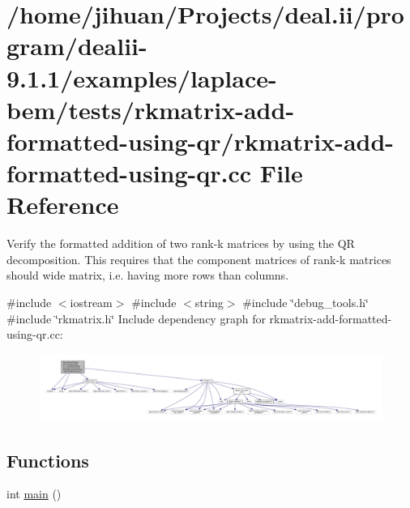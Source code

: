 \hypertarget{rkmatrix-add-formatted-using-qr_8cc}{}\section{/home/jihuan/\+Projects/deal.ii/program/dealii-\/9.1.1/examples/laplace-\/bem/tests/rkmatrix-\/add-\/formatted-\/using-\/qr/rkmatrix-\/add-\/formatted-\/using-\/qr.cc File Reference}
\label{rkmatrix-add-formatted-using-qr_8cc}


Verify the formatted addition of two rank-\/k matrices by using the QR decomposition. This requires that the component matrices of rank-\/k matrices should wide matrix, i.\+e. having more rows than columns.  


{\ttfamily \#include $<$iostream$>$}\newline
{\ttfamily \#include $<$string$>$}\newline
{\ttfamily \#include \char`\"{}debug\+\_\+tools.\+h\char`\"{}}\newline
{\ttfamily \#include \char`\"{}rkmatrix.\+h\char`\"{}}\newline
Include dependency graph for rkmatrix-\/add-\/formatted-\/using-\/qr.cc\+:\nopagebreak
\begin{figure}[H]
\begin{center}
\leavevmode
\includegraphics[width=350pt]{rkmatrix-add-formatted-using-qr_8cc__incl}
\end{center}
\end{figure}
\subsection*{Functions}
\begin{DoxyCompactItemize}
\item 
int \hyperlink{rkmatrix-add-formatted-using-qr_8cc_ae66f6b31b5ad750f1fe042a706a4e3d4}{main} ()
\end{DoxyCompactItemize}


